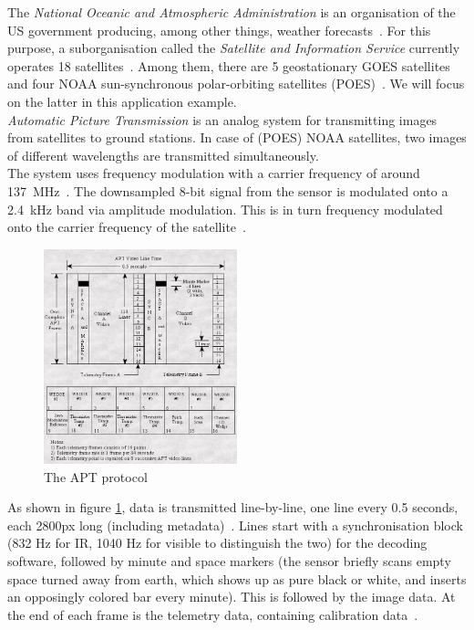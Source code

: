 \documentclass[conference]{IEEEtran}
\begin{document}
The \textit{National Oceanic and Atmospheric Administration} is an organisation of the US government producing, among other things, weather forecasts~\cite{NOAA19agency}. For this purpose, a suborganisation called the \textit{Satellite and Information Service} currently operates 18 satellites~\cite{NOAA19currently}. Among them, there are 5 geostationary GOES satellites and four NOAA sun-synchronous polar-orbiting satellites (POES)~\cite{NOAA19satellites}. We will focus on the latter in this application example.\\
\textit{Automatic Picture Transmission} is an analog system for transmitting images from satellites to ground stations. In case of (POES) NOAA satellites, two images of different wavelengths are transmitted simultaneously.\\
The system uses frequency modulation with a carrier frequency of around 137~MHz~\cite{NOAA19status}. The downsampled 8-bit signal from the sensor is modulated onto a 2.4~kHz band via amplitude modulation. This is in turn frequency modulated onto the carrier frequency of the satellite~\cite{NOAA19building}.\\
\begin{figure}
\centering
\caption{The APT protocol~\cite{NOAA19building}} \label{fig:aptprotocol}
\includegraphics[width=0.5\textwidth]{apt_protocol}
\end{figure}
As shown in figure \ref{fig:aptprotocol}, data is transmitted line-by-line, one line every 0.5 seconds, each 2800px long (including metadata)~\cite[2p]{dascal2012advanced}. Lines start with a synchronisation block (832 Hz for IR, 1040 Hz for visible to distinguish the two) for the decoding software, followed by minute and space markers (the sensor briefly scans empty space turned away from earth, which shows up as pure black or white, and inserts an opposingly colored bar every minute). This is followed by the image data. At the end of each frame is the telemetry data, containing calibration data~\cite[41pp]{NOAA19building}.\\
\end{document}
